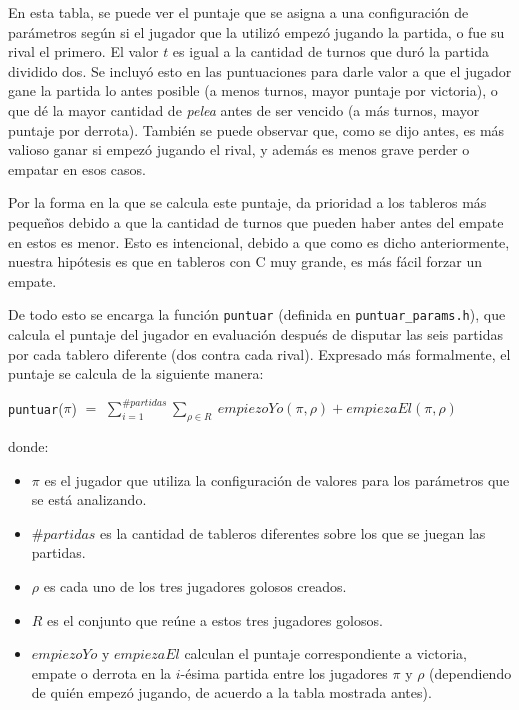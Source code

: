 \documentclass[12pt,a4paper]{article}
\begin{document}
    En esta tabla, se puede ver el puntaje que se asigna a una configuración de parámetros según si el jugador que la utilizó empezó jugando la partida, o fue su rival el primero. El valor $t$ es igual a la cantidad de turnos que duró la partida dividido dos. Se incluyó esto en las puntuaciones para darle valor a que el jugador gane la partida lo antes posible (a menos turnos, mayor puntaje por victoria), o que dé la mayor cantidad de \textit{pelea} antes de ser vencido (a más turnos, mayor puntaje por derrota). También se puede observar que, como se dijo antes, es más valioso ganar si empezó jugando el rival, y además es menos grave perder o empatar en esos casos.
    
    Por la forma en la que se calcula este puntaje, da prioridad a los tableros más pequeños debido a que la cantidad de turnos que pueden haber antes del empate en estos es menor. Esto es intencional, debido a que como es dicho anteriormente, nuestra hipótesis es que en tableros con C muy grande, es más fácil forzar un empate.
    
    De todo esto se encarga la función \texttt{puntuar} (definida en \texttt{puntuar\_params.h}), que calcula el puntaje del jugador en evaluación después de disputar las seis partidas por cada tablero diferente (dos contra cada rival). Expresado más formalmente, el puntaje se calcula de la siguiente manera:
    
    \begin{center}
        \texttt{puntuar}($\pi$) $=$ $\sum_{i = 1}^{\#partidas} \sum_{\rho \in R} \ empiezoYo(\pi, \rho) + empiezaEl(\pi, \rho)$ 
    \end{center}
    donde:
        \begin{itemize}
            \item $\pi$ es el jugador que utiliza la configuración de valores para los parámetros que se está analizando.
            \item $\#partidas$ es la cantidad de tableros diferentes sobre los que se juegan las partidas.
            \item $\rho$ es cada uno de los tres jugadores golosos creados.
            \item $R$ es el conjunto que reúne a estos tres jugadores golosos.
            \item $empiezoYo$ y $empiezaEl$ calculan el puntaje correspondiente a victoria, empate o derrota en la $i$-ésima partida entre los jugadores $\pi$ y $\rho$ (dependiendo de quién empezó jugando, de acuerdo a la tabla mostrada antes).
        \end{itemize}
        
\end{document}
